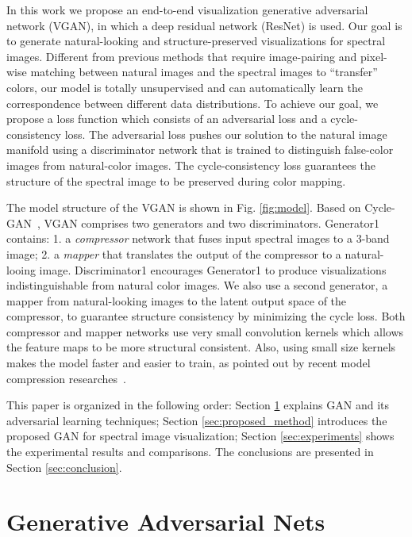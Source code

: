 \documentclass[10pt,conference,a4paper]{IEEEtran}
\begin{document}
In this work we propose an end-to-end visualization generative adversarial network (VGAN), in which a deep residual network (ResNet) is used.
Our goal is to generate natural-looking and structure-preserved visualizations for spectral images.
Different from previous methods that require image-pairing and pixel-wise matching between natural images and the spectral images to ``transfer''  colors, our model is totally unsupervised and can automatically learn the correspondence between different data distributions.
To achieve our goal, we propose a loss function which consists of an adversarial loss and a cycle-consistency loss.
The adversarial loss pushes our solution to the natural image manifold using a discriminator network
that is trained to distinguish false-color images from natural-color images.
The cycle-consistency loss guarantees the structure of the spectral image to be preserved during color mapping.

The model structure of the VGAN is shown in Fig. \ref{fig:model}.
Based on Cycle-GAN~\cite{cyclegan}, VGAN comprises two generators and two discriminators.
Generator1 contains: 1. a \textit{compressor} network that fuses input spectral images to a 3-band image; 2. a \textit{mapper} that translates the output of the compressor to a natural-looing image.
Discriminator1 encourages Generator1 to produce visualizations indistinguishable from natural color images.
We also use a second generator, a mapper from natural-looking images to the latent output space of the compressor, to guarantee structure consistency by minimizing the cycle loss.
Both compressor and mapper networks use very small convolution kernels which allows the feature maps to be more structural consistent. Also, using small size kernels makes the model faster and easier to train, as pointed out by recent model compression researches~\cite{squeezenet2016,mobilenet2017}.


This paper is organized in the following order: Section \ref{sec:gan} explains GAN and its adversarial learning techniques; Section \ref{sec:proposed_method} introduces the proposed GAN for spectral image visualization; Section \ref{sec:experiments} shows the experimental results and comparisons. The conclusions are presented in Section \ref{sec:conclusion}.


\section{Generative Adversarial Nets}
\label{sec:gan}
\end{document}
